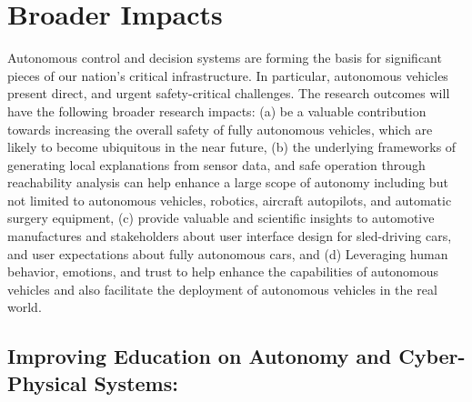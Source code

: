 \section{Broader Impacts}
\label{sec:broader}

Autonomous control and decision systems are forming the basis for significant pieces of our nation’s critical infrastructure. In particular, autonomous vehicles present direct, and urgent safety-critical challenges. The research outcomes will have the following broader research impacts: (a) be a valuable contribution towards increasing the overall safety of fully autonomous vehicles, which are likely to become ubiquitous in the near future, (b) the underlying frameworks of generating local explanations from sensor data, and safe operation through reachability analysis can help enhance a large scope of autonomy including but not limited to autonomous vehicles, robotics, aircraft autopilots, and automatic surgery equipment, 
(c) provide valuable and scientific insights to automotive manufactures and stakeholders about user interface design for sled-driving cars, and user expectations about fully autonomous cars, and (d) Leveraging human behavior, emotions, and trust to help enhance the capabilities of autonomous vehicles and also facilitate the deployment of autonomous vehicles in the real world.

\subsection{Improving Education on Autonomy and Cyber-Physical Systems:}

